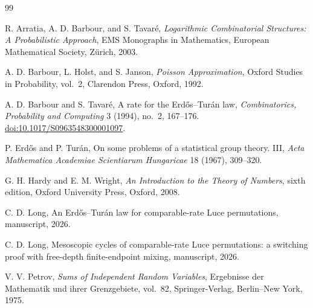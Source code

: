 \documentclass[11pt]{article}
\theoremstyle{remark}
\begin{document}
\begin{thebibliography}{99}

R. Arratia, A. D. Barbour, and S. Tavar\'e,
\newblock \emph{Logarithmic Combinatorial Structures: A Probabilistic
Approach},
\newblock EMS Monographs in Mathematics, European Mathematical Society,
Z\"urich, 2003.

A. D. Barbour, L. Holst, and S. Janson,
\newblock \emph{Poisson Approximation},
\newblock Oxford Studies in Probability, vol.~2, Clarendon Press, Oxford,
1992.

A. D. Barbour and S. Tavar\'e,
\newblock A rate for the Erd\H{o}s--Tur\'an law,
\newblock \emph{Combinatorics, Probability and Computing} 3 (1994), no.~2,
167--176.
\newblock \href{https://doi.org/10.1017/S0963548300001097}
{doi:10.1017/S0963548300001097}.

P. Erd\H{o}s and P. Tur\'an,
\newblock On some problems of a statistical group theory. III,
\newblock \emph{Acta Mathematica Academiae Scientiarum Hungaricae} 18
(1967), 309--320.

G. H. Hardy and E. M. Wright,
\newblock \emph{An Introduction to the Theory of Numbers}, sixth edition,
\newblock Oxford University Press, Oxford, 2008.

C. D. Long,
\newblock An Erd\H{o}s--Tur\'an law for comparable-rate Luce permutations,
\newblock manuscript, 2026.

C. D. Long,
\newblock Mesoscopic cycles of comparable-rate Luce permutations: a
switching proof with free-depth finite-endpoint mixing,
\newblock manuscript, 2026.

V. V. Petrov,
\newblock \emph{Sums of Independent Random Variables},
\newblock Ergebnisse der Mathematik und ihrer Grenzgebiete, vol.~82,
Springer-Verlag, Berlin--New York, 1975.

\end{thebibliography}
\end{document}
